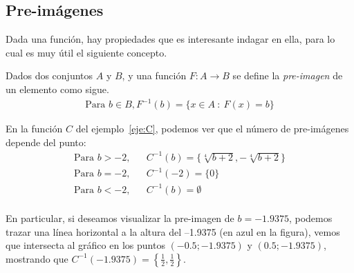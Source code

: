\subsection{Pre-imágenes}

Dada una función, hay propiedades que es interesante indagar en ella, para lo cual es muy útil el siguiente concepto.

\vspace{.2cm}


\begin{defn}
Dados dos conjuntos $A$ y $B$, y una función $F : A\rightarrow B$ se define la \emph{pre-imagen} de un elemento como sigue.
\begin{eqnarray*}
\textrm{Para }b\in B, F^{-1}(b)=\{x\in A\ :\ F(x)=b\}
\end{eqnarray*}
\end{defn}

\begin{ejemplo}
En la función $C$ del ejemplo~\ref{eje:C}, podemos ver que el número de pre-imágenes depende del punto:
\begin{eqnarray*}
\textrm{Para }b>-2,&& C^{-1}(b)=\{\sqrt[4]{b+2},-\sqrt[4]{b+2}\}\\
\textrm{Para }b=-2,&& C^{-1}(-2)=\{0\}\\
\textrm{Para }b<-2,&& C^{-1}(b)=\emptyset\\
\end{eqnarray*}
\begin{center}
\end{center}
En particular, si deseamos visualizar la pre-imagen de $b=-1.9375$, podemos trazar una línea horizontal a la altura del --1.9375 (en azul en la figura), vemos que intersecta al gráfico en los puntos $(-0.5;-1.9375)$ y $(0.5;-1.9375)$, mostrando que $C^{-1}(-1.9375)=\left\{\frac{1}{2},\frac{1}{2}\right\}$.
\end{ejemplo}

